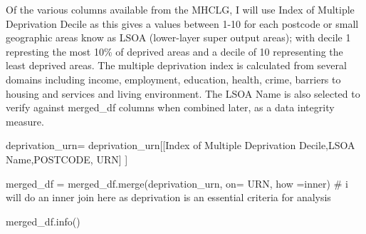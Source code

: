 \documentclass[
  letterpaper,
  DIV=11,
  numbers=noendperiod]{scrartcl}
\newenvironment{Shaded}{\begin{snugshade}}{\end{snugshade}}
\newcommand{\CommentTok}[1]{\textcolor[rgb]{0.37,0.37,0.37}{#1}}
\newcommand{\NormalTok}[1]{\textcolor[rgb]{0.00,0.23,0.31}{#1}}
\newcommand{\OperatorTok}[1]{\textcolor[rgb]{0.37,0.37,0.37}{#1}}
\newcommand{\StringTok}[1]{\textcolor[rgb]{0.13,0.47,0.30}{#1}}
\begin{document}
Of the various columns available from the MHCLG, I will use Index of
Multiple Deprivation Decile as this gives a values between 1-10 for each
postcode or small geographic areas know as LSOA (lower-layer super
output areas); with decile 1 represting the most 10\% of deprived areas
and a decile of 10 representing the least deprived areas. The multiple
deprivation index is calculated from several domains including income,
employment, education, health, crime, barriers to housing and services
and living environment. The LSOA Name is also selected to verify against
merged\_df columns when combined later, as a data integrity measure.

\begin{Shaded}
\begin{Highlighting}[]
\NormalTok{deprivation\_urn}\OperatorTok{=}\NormalTok{ deprivation\_urn[[}\StringTok{\textquotesingle{}Index of Multiple Deprivation Decile\textquotesingle{}}\NormalTok{,}\StringTok{\textquotesingle{}LSOA Name\textquotesingle{}}\NormalTok{,}\StringTok{\textquotesingle{}POSTCODE\textquotesingle{}}\NormalTok{, }\StringTok{\textquotesingle{}URN\textquotesingle{}}\NormalTok{]}
\NormalTok{]}
\end{Highlighting}
\end{Shaded}

\begin{Shaded}
\begin{Highlighting}[]
\NormalTok{merged\_df }\OperatorTok{=}\NormalTok{ merged\_df.merge(deprivation\_urn, on}\OperatorTok{=} \StringTok{\textquotesingle{}URN\textquotesingle{}}\NormalTok{, how }\OperatorTok{=}\StringTok{\textquotesingle{}inner\textquotesingle{}}\NormalTok{) }
\CommentTok{\# i will do an inner join here as deprivation is an essential criteria for analysis}
\end{Highlighting}
\end{Shaded}

\begin{Shaded}
\begin{Highlighting}[]
\NormalTok{merged\_df.info()}
\end{Highlighting}
\end{Shaded}
\end{document}
